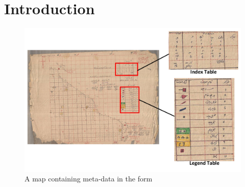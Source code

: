 \section{Introduction}
\label{intro}

\begin{figure}[tbhp]
    \includegraphics[width=\linewidth,keepaspectratio,angle=0]{Fig1_massavi_Tables.pdf}
    \caption{A map containing meta-data in the form%
    }
    \label{fig:masavi}
\end{figure}

